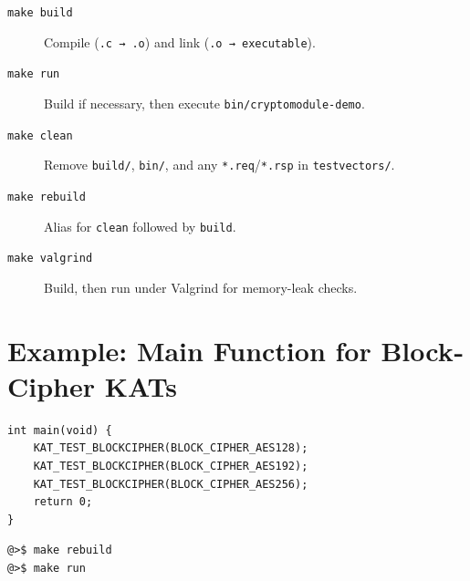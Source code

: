 \documentclass[11pt,a4paper]{report}
\theoremstyle{definitionstyle}
\begin{document}
\begin{description}
	\item[\texttt{make build}] Compile (\texttt{.c → .o}) and link (\texttt{.o → executable}).
	\item[\texttt{make run}] Build if necessary, then execute \texttt{bin/cryptomodule-demo}.
	\item[\texttt{make clean}] Remove \texttt{build/}, \texttt{bin/}, and any \texttt{*.req}/\texttt{*.rsp} in \texttt{testvectors/}.
	\item[\texttt{make rebuild}] Alias for \texttt{clean} followed by \texttt{build}.
	\item[\texttt{make valgrind}] Build, then run under Valgrind for memory-leak checks.
\end{description}
%


\newpage
\section{Example: Main Function for Block‐Cipher KATs}
\begin{lstlisting}[caption={Invoke known-answer tests for AES block ciphers},label={lst:main-kat},captionpos=t]
int main(void) {
	KAT_TEST_BLOCKCIPHER(BLOCK_CIPHER_AES128);
	KAT_TEST_BLOCKCIPHER(BLOCK_CIPHER_AES192);
	KAT_TEST_BLOCKCIPHER(BLOCK_CIPHER_AES256);
	return 0;
}
\end{lstlisting}
\begin{lstlisting}[]
@>$ make rebuild
@>$ make run
\end{lstlisting}
\end{document}
